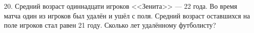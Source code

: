 20. Средний возраст одиннадцати игроков <<Зенита>> --- 22 года. Во время матча один из игроков был удалён и ушёл с поля. Средний возраст оставшихся на поле игроков стал равен 21 году. Сколько лет удалённому футболисту?\\
